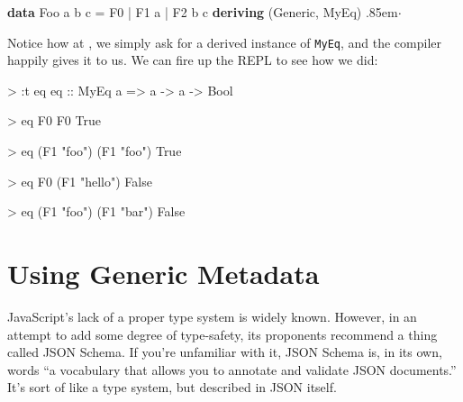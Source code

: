 \documentclass[
  11pt,
]{book}
\makeatletter
\newenvironment{Shaded}{}{}
\newcommand{\DataTypeTok}[1]{\textcolor[rgb]{0.56,0.13,0.00}{#1}}
\newcommand{\KeywordTok}[1]{\textcolor[rgb]{0.00,0.44,0.13}{\textbf{#1}}}
\newcommand{\NormalTok}[1]{#1}
\newcommand{\OperatorTok}[1]{\textcolor[rgb]{0.40,0.40,0.40}{#1}}
\newcommand{\OtherTok}[1]{\textcolor[rgb]{0.00,0.44,0.13}{#1}}
\newcommand{\StringTok}[1]{\textcolor[rgb]{0.25,0.44,0.63}{#1}}
\newcommand{\anncirc}[1]{\raisebox{-0.5mm}{\tikz\node[text=white,
font=\sffamily\bfseries,minimum size=2mm,inner sep=0mm,draw,circle,fill=black]
{\small #1};}}
\newcommand{\ann}[1]{\hspace{1.5mm}\anncirc{#1}\hspace{1.5mm}}
\newcommand{\annotate}[1]{\Dotfill\quad\anncirc{#1}\qquad}
\newcommand{\Dotfill}{\leavevmode \cleaders \hb@xt@.85em{\ensuremath{\hss
\cdot\hss}}
\hfill \kern \z@}
\theoremstyle{nonumberplain}
\makeatother
\begin{document}
\begin{Shaded}
\begin{Highlighting}[]
\KeywordTok{data} \DataTypeTok{Foo}\NormalTok{ a b c}
  \OtherTok{=} \DataTypeTok{F0}
  \OperatorTok{|} \DataTypeTok{F1}\NormalTok{ a}
  \OperatorTok{|} \DataTypeTok{F2}\NormalTok{ b c}
  \KeywordTok{deriving}\NormalTok{ (}\DataTypeTok{Generic}\NormalTok{, }\DataTypeTok{MyEq}\NormalTok{)  }\annotate{1}
\end{Highlighting}
\end{Shaded}

Notice how at \ann{1}, we simply ask for a derived instance of
\texttt{MyEq}, and the compiler happily gives it to us. We can fire up
the REPL to see how we did:

\begin{Shaded}
\begin{Highlighting}[]
\OperatorTok{\textgreater{}} \OperatorTok{:}\NormalTok{t eq}
\OtherTok{eq ::} \DataTypeTok{MyEq}\NormalTok{ a }\OtherTok{=\textgreater{}}\NormalTok{ a }\OtherTok{{-}\textgreater{}}\NormalTok{ a }\OtherTok{{-}\textgreater{}} \DataTypeTok{Bool}


\OperatorTok{\textgreater{}}\NormalTok{ eq }\DataTypeTok{F0} \DataTypeTok{F0}
\DataTypeTok{True}


\OperatorTok{\textgreater{}}\NormalTok{ eq (}\DataTypeTok{F1} \StringTok{"foo"}\NormalTok{) (}\DataTypeTok{F1} \StringTok{"foo"}\NormalTok{)}
\DataTypeTok{True}


\OperatorTok{\textgreater{}}\NormalTok{ eq }\DataTypeTok{F0}\NormalTok{ (}\DataTypeTok{F1} \StringTok{"hello"}\NormalTok{)}
\DataTypeTok{False}


\OperatorTok{\textgreater{}}\NormalTok{ eq (}\DataTypeTok{F1} \StringTok{"foo"}\NormalTok{) (}\DataTypeTok{F1} \StringTok{"bar"}\NormalTok{)}
\DataTypeTok{False}
\end{Highlighting}
\end{Shaded}

\hypertarget{using-generic-metadata}{%
\section{Using Generic Metadata}\label{using-generic-metadata}}

JavaScript's lack of a proper type system is widely known. However, in
an attempt to add some degree of type-safety, its proponents recommend a
thing called JSON Schema. If you're unfamiliar with it, JSON Schema is,
in its own, words ``a vocabulary that allows you to annotate and
validate JSON documents.'' It's sort of like a type system, but
described in JSON itself.
\end{document}

